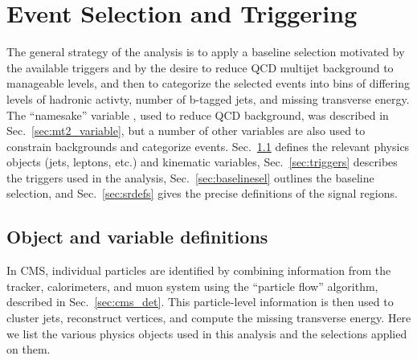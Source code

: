 \chapter{Event Selection and Triggering}
\label{chap:event_selection}

The general strategy of the \mttwo analysis is to apply a baseline selection
motivated by the available triggers and by the desire to reduce QCD multijet
background to manageable levels, and then to categorize the selected events
into bins of differing levels of hadronic activty, number of b-tagged jets, 
and missing transverse energy. The ``namesake'' variable \mttwo, used to reduce
QCD background, was described in Sec.~\ref{sec:mt2_variable}, but a number of other
variables are also used to constrain backgrounds and categorize events.
Sec.~\ref{sec:objvardefs} defines the
relevant physics objects (jets, leptons, etc.) and kinematic variables, Sec.~\ref{sec:triggers} describes
the triggers used in the analysis, Sec.~\ref{sec:baselinesel} outlines the
baseline selection, and Sec.~\ref{sec:srdefs} gives the precise definitions
of the signal regions.

\section{Object and variable definitions}
\label{sec:objvardefs}

In CMS, individual particles are identified by combining information from the tracker, calorimeters, and muon system
using the ``particle flow'' algorithm, described in Sec.~\ref{sec:cms_det}. This particle-level information is
then used to cluster jets, reconstruct vertices, and compute the missing transverse energy. Here we list the various
physics objects used in this analysis and the selections applied on them.

